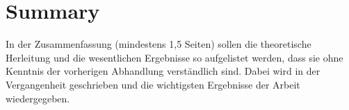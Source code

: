 \chapter{Summary}

In der Zusammenfassung (mindestens 1,5 Seiten) sollen die theoretische Herleitung
und die wesentlichen Ergebnisse so aufgelistet werden, dass sie ohne Kenntnis der
vorherigen Abhandlung verständlich sind. Dabei wird in der Vergangenheit geschrieben und die wichtigsten Ergebnisse
der Arbeit wiedergegeben.